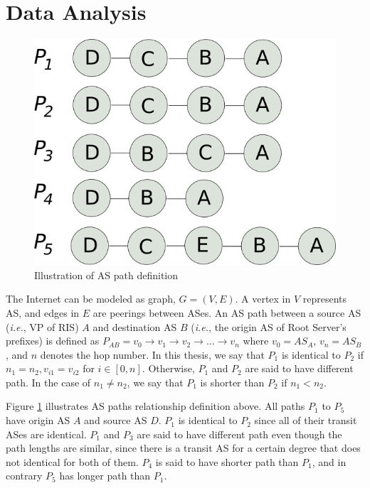 \section{Data Analysis}
\label{ch03:analysis}



\begin{figure}
	\centering
	\includegraphics[width=.5\linewidth]{img/as-path}
	\caption{Illustration of AS path definition}
	\label{fig:ch03:as_path}
\end{figure}

The Internet can be modeled as graph, $G=(V,E)$. A vertex in $V$ represents AS, and edges in $E$ are peerings between ASes. An AS path between a source AS (\textit{i.e.}, VP of RIS) $A$ and destination AS $B$ (\textit{i.e.}, the origin AS of Root Server's prefixes)  is defined as $P_{AB}=v_0\rightarrow v_1\rightarrow v_2 \rightarrow ... \rightarrow v_{n}$ where $v_0=AS_A$, $v_{n}=AS_B$, and $n$ denotes the hop number. In this thesis, we say that $P_1$ is identical to $P_2$ if $n_1 = n_2, v_{i1}=v_{i2}$ for $i\in [0,n]$. Otherwise, $P_1$ and $P_2$ are said to have different path. In the case of $n_1 \neq n_2$, we say that $P_1$ is shorter than $P_2$ if $n_1 < n_2$.


Figure \ref{fig:ch03:as_path} illustrates AS paths relationship definition above. All paths $P_1$ to $P_5$ have origin AS $A$ and source AS $D$. $P_1$ is identical to $P_2$ since all of their transit ASes are identical. $P_1$ and $P_3$ are said to have different path even though the path lengths are similar, since there is a transit AS for a certain degree that does not identical for both of them. $P_4$ is said to have shorter path than $P_1$, and in contrary $P_5$ has longer path than $P_1$.

